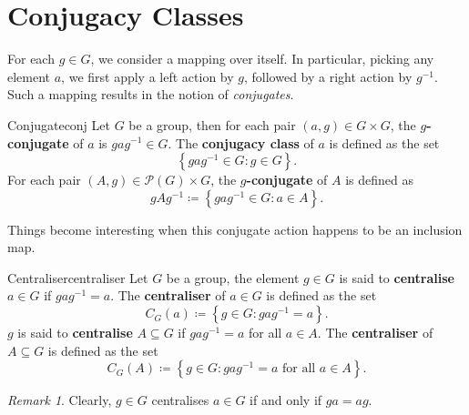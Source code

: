 \documentclass[math]{amznotes}
\theoremstyle{remark}
\newtheorem*{remark}{Remark}
\newcommand{\0}{\mathbf{0}}
\newcommand{\1}{\mathbf{1}}
\begin{document}
\section{Conjugacy Classes}
For each $g \in G$, we consider a mapping over itself. In particular, picking any element $a$, we first apply a left action by $g$, followed by a right action by $g^{-1}$. Such a mapping results in the notion of \textit{conjugates}. 
\begin{dfnbox}{Conjugate}{conj}
    Let $G$ be a group, then for each pair $\left(a, g\right) \in G \times G$, the {\color{red} \textbf{$g$-conjugate}} of $a$ is $gag^{-1} \in G$. The {\color{red} \textbf{conjugacy class}} of $a$ is defined as the set 
    \begin{equation*}
        \left\{gag^{-1} \in G \colon g \in G\right\}.
    \end{equation*}
    For each pair $\left(A, g\right) \in \mathcal{P}\left(G\right) \times G$, the {\color{red} \textbf{$g$-conjugate}} of $A$ is defined as 
    \begin{equation*}
        gAg^{-1} \coloneqq \left\{gag^{-1} \in G \colon a \in A\right\}.
    \end{equation*}
\end{dfnbox}
Things become interesting when this conjugate action happens to be an inclusion map.
\begin{dfnbox}{Centraliser}{centraliser}
    Let $G$ be a group, the element $g \in G$ is said to {\color{red} \textbf{centralise}} $a \in G$ if $gag^{-1} = a$. The {\color{red} \textbf{centraliser}} of $a \in G$ is defined as the set 
    \begin{equation*}
        C_G\left(a\right) \coloneqq \left\{g \in G \colon gag^{-1} = a\right\}.
    \end{equation*}
    $g$ is said to {\color{red} \textbf{centralise}} $A \subseteq G$ if $gag^{-1} = a$ for all $a \in A$. The {\color{red} \textbf{centraliser}} of $A \subseteq G$ is defined as the set 
    \begin{equation*}
        C_G\left(A\right) \coloneqq \left\{g \in G \colon gag^{-1} = a \textrm{ for all } a \in A\right\}.
    \end{equation*}
\end{dfnbox}
\begin{notebox}
    \begin{remark}
        Clearly, $g \in G$ centralises $a \in G$ if and only if $ga = ag$.
    \end{remark}
\end{notebox}
\end{document}
